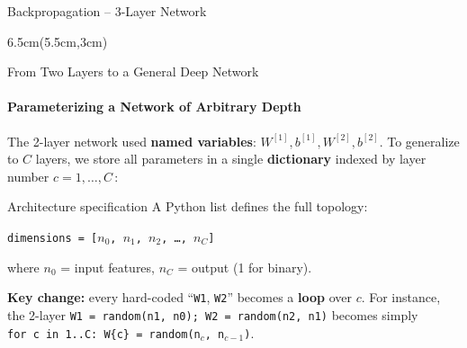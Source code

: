 \documentclass[aspectratio=169]{beamer}
\begin{document}
\begin{frame}{Backpropagation – 3-Layer Network}
\begin{textblock*}{6.5cm}(5.5cm,3cm)
\end{textblock*}

\end{frame}
%
%
\begin{frame}[fragile]{From Two Layers to a General Deep Network}
\framesubtitle{Parameterizing a Network of Arbitrary Depth}

{\small The 2-layer network used \textbf{named variables}: $W^{[1]}\!, b^{[1]}\!, W^{[2]}\!, b^{[2]}$. To generalize to $C$ layers, we store all parameters in a single \textbf{dictionary} indexed by layer number $c = 1, \dots, C$\,:}

\begin{block}{\small Architecture specification}
{\small A Python list defines the full topology:}
\begin{center}
\texttt{\small dimensions = [$n_0$, $n_1$, $n_2$, \dots, $n_C$]}
\end{center}
{\small where $n_0$ = input features, $n_C$ = output (1 for binary).}
\end{block}

{\small\textbf{Key change:} every hard-coded ``\texttt{W1}, \texttt{W2}'' becomes a \textbf{loop} over $c$. For instance, the 2-layer \texttt{W1~=~random(n1,~n0);~W2~=~random(n2,~n1)} becomes simply \texttt{for~c~in~1..C:~W\{c\}~=~random(n$_c$,~n$_{c-1}$)}.}

\end{frame}
%
%
\end{document}
